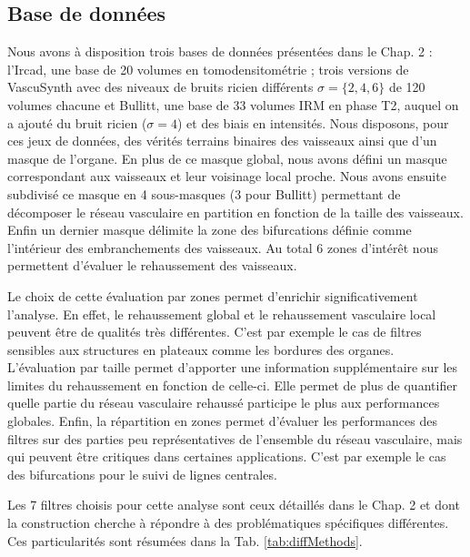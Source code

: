 \subsection{Base de données}
Nous avons à disposition trois bases de données présentées dans le Chap. 2 : l'Ircad, une base de 20 volumes en tomodensitométrie ; trois versions de VascuSynth avec des niveaux de bruits ricien différents $\sigma=\{2,4,6\}$ de 120 volumes chacune et Bullitt, une base de 33 volumes IRM en phase T2, auquel on a ajouté du bruit ricien ($\sigma=4$) et des biais en intensités. Nous disposons, pour ces jeux de données, des vérités terrains binaires des vaisseaux ainsi que d'un masque de l'organe. En plus de ce masque global, nous avons défini un masque correspondant aux vaisseaux et leur voisinage local proche. Nous avons ensuite subdivisé ce masque en 4 sous-masques (3 pour Bullitt) permettant de décomposer le réseau vasculaire en partition en fonction de la taille des vaisseaux. Enfin un dernier masque délimite la zone des bifurcations définie comme l'intérieur des embranchements des vaisseaux. Au total 6 zones d'intérêt nous permettent d'évaluer le rehaussement des vaisseaux. 

Le choix de cette évaluation par zones permet d'enrichir significativement l'analyse. En effet, le rehaussement global et le rehaussement vasculaire local peuvent être de qualités très différentes. C'est par exemple le cas de filtres sensibles aux structures en plateaux comme les bordures des organes. L'évaluation par taille permet d'apporter une information supplémentaire sur les limites du rehaussement en fonction de celle-ci. Elle permet de plus de quantifier quelle partie du réseau vasculaire rehaussé participe le plus aux performances globales. Enfin, la répartition en zones permet d'évaluer les performances des filtres sur des parties peu représentatives de l'ensemble du réseau vasculaire, mais qui peuvent être critiques dans certaines applications. C'est par exemple le cas des bifurcations pour le suivi de lignes centrales.

Les 7 filtres choisis pour cette analyse sont ceux détaillés dans le Chap. 2 et dont la construction cherche à répondre à des problématiques spécifiques différentes. Ces particularités sont résumées dans la Tab. \ref{tab:diffMethods}. 

